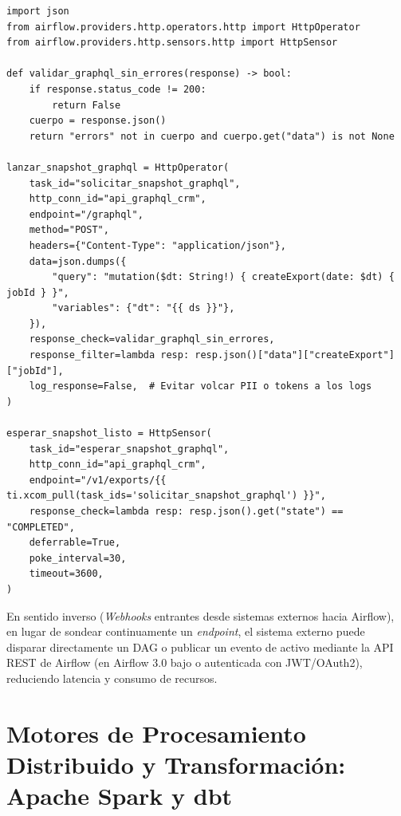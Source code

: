 \begin{lstlisting}[style=python, caption={Consumo seguro de GraphQL con \texttt{HttpOperator} y espera asíncrona con \texttt{HttpSensor}.}, label={lst:http-graphql-sensor}]
import json
from airflow.providers.http.operators.http import HttpOperator
from airflow.providers.http.sensors.http import HttpSensor

def validar_graphql_sin_errores(response) -> bool:
    if response.status_code != 200:
        return False
    cuerpo = response.json()
    return "errors" not in cuerpo and cuerpo.get("data") is not None

lanzar_snapshot_graphql = HttpOperator(
    task_id="solicitar_snapshot_graphql",
    http_conn_id="api_graphql_crm",
    endpoint="/graphql",
    method="POST",
    headers={"Content-Type": "application/json"},
    data=json.dumps({
        "query": "mutation($dt: String!) { createExport(date: $dt) { jobId } }",
        "variables": {"dt": "{{ ds }}"},
    }),
    response_check=validar_graphql_sin_errores,
    response_filter=lambda resp: resp.json()["data"]["createExport"]["jobId"],
    log_response=False,  # Evitar volcar PII o tokens a los logs
)

esperar_snapshot_listo = HttpSensor(
    task_id="esperar_snapshot_graphql",
    http_conn_id="api_graphql_crm",
    endpoint="/v1/exports/{{ ti.xcom_pull(task_ids='solicitar_snapshot_graphql') }}",
    response_check=lambda resp: resp.json().get("state") == "COMPLETED",
    deferrable=True,
    poke_interval=30,
    timeout=3600,
)
\end{lstlisting}

En sentido inverso (\textit{Webhooks} entrantes desde sistemas externos hacia Airflow), en lugar de sondear continuamente un \textit{endpoint}, el sistema externo puede disparar directamente un DAG o publicar un evento de activo mediante la API REST de Airflow (en Airflow 3.0 bajo  o  autenticada con JWT/OAuth2), reduciendo latencia y consumo de recursos.

\section{Motores de Procesamiento Distribuido y Transformación: Apache Spark y dbt}\label{sec:conectores-spark-dbt}

